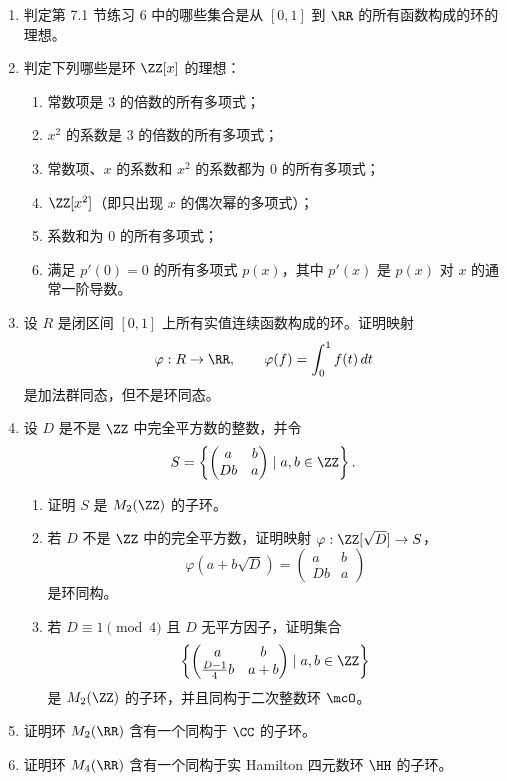 \begin{enumerate}[label=\arabic*.]
\begin{enumerate}[label=(\alph*)]
		\item $\{(a,-a)\mid a\in\ZZ\}$。
	\end{enumerate}
	\item 判定第 7.1 节练习 6 中的哪些集合是从 $[0,1]$ 到 $\RR$ 的所有函数构成的环的理想。
	\item 判定下列哪些是环 $\ZZ[x]$ 的理想：
	\begin{enumerate}[label=(\alph*)]
		\item 常数项是 $3$ 的倍数的所有多项式；
		\item $x^2$ 的系数是 $3$ 的倍数的所有多项式；
		\item 常数项、$x$ 的系数和 $x^2$ 的系数都为 $0$ 的所有多项式；
		\item $\ZZ[x^2]$（即只出现 $x$ 的偶次幂的多项式）；
		\item 系数和为 $0$ 的所有多项式；
		\item 满足 $p'(0)=0$ 的所有多项式 $p(x)$，其中 $p'(x)$ 是 $p(x)$ 对 $x$ 的通常一阶导数。
	\end{enumerate}
	\item 设 $R$ 是闭区间 $[0,1]$ 上所有实值连续函数构成的环。证明映射
	\[
	\varphi:R\to\RR,
	\qquad \varphi(f)=\int_0^1 f(t)\,dt
	\]
	是加法群同态，但不是环同态。
	\item 设 $D$ 是不是 $\ZZ$ 中完全平方数的整数，并令
	\[
	S=\left\{\begin{pmatrix}a&b\\ Db&a\end{pmatrix}\mid a,b\in\ZZ\right\}.
	\]
	\begin{enumerate}[label=(\alph*)]
		\item 证明 $S$ 是 $M_2(\ZZ)$ 的子环。
		\item 若 $D$ 不是 $\ZZ$ 中的完全平方数，证明映射 $\varphi:\ZZ[\sqrt D]\to S$，
		\[
		\varphi(a+b\sqrt D)=\begin{pmatrix}a&b\\Db&a\end{pmatrix}
		\]
		是环同构。
		\item 若 $D\equiv1\pmod4$ 且 $D$ 无平方因子，证明集合
		\[
		\left\{\begin{pmatrix}a&b\\ \frac{D-1}{4}b&a+b\end{pmatrix}\mid a,b\in\ZZ\right\}
		\]
		是 $M_2(\ZZ)$ 的子环，并且同构于二次整数环 $\mcO$。
	\end{enumerate}
	\item 证明环 $M_2(\RR)$ 含有一个同构于 $\CC$ 的子环。
	\item 证明环 $M_4(\RR)$ 含有一个同构于实 Hamilton 四元数环 $\HH$ 的子环。

\end{enumerate}
